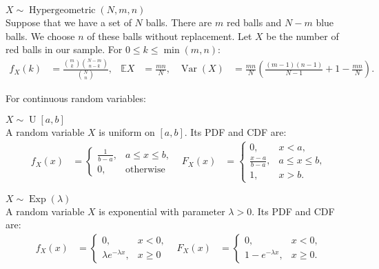 \documentclass{huhtakm-template-book-v2}
\newcommand{\expect}{\mathbb{E}}
\DeclareMathOperator{\Hypergeometric}{Hypergeometric}
\DeclareMathOperator{\U}{U}
\DeclareMathOperator{\Exp}{Exp}
\DeclareMathOperator{\Var}{Var}
\begin{document}
    \begin{seg} $X \sim \Hypergeometric(N,m,n)$\\
        Suppose that we have a set of $N$ balls. There are $m$ red balls and $N-m$ blue balls. We choose $n$ of these balls without replacement. Let $X$ be the number of red balls in our sample. For $0 \leq k \leq \min(m,n)$:
        \begin{align*}
            f_{X}(k) &= \frac{\binom{m}{k}\binom{N-m}{n-k}}{\binom{N}{n}}, & \expect{X} &= \frac{mn}{N}, & \Var(X) &= \frac{mn}{N}\left(\frac{(m-1)(n-1)}{N-1}+1-\frac{mn}{N}\right).
        \end{align*}
    \end{seg}
    For continuous random variables:
    \begin{seg} $X \sim \U[a, b]$\\
        A random variable $X$ is uniform on $[a, b]$. Its PDF and CDF are:
        \begin{align*}
            f_{X}(x) &= \begin{cases}
                \frac{1}{b-a}, &a \leq x \leq b,\\
                0, &\text{otherwise}
            \end{cases} & F_{X}(x) &= \begin{cases}
                0, &x < a,\\
                \frac{x-a}{b-a}, &a \leq x \leq b,\\
                1, &x > b.
            \end{cases}
        \end{align*}    
    \end{seg}
    \begin{seg} $X \sim \Exp(\lambda)$\\
        A random variable $X$ is exponential with parameter $\lambda > 0$. Its PDF and CDF are:
        \begin{align*}
            f_{X}(x) &= \begin{cases}
                0, &x < 0,\\
                \lambda e^{-\lambda x}, &x \geq 0
            \end{cases} & F_{X}(x) &= \begin{cases}
                0, &x < 0,\\
                1-e^{-\lambda x}, &x \geq 0.
            \end{cases}
        \end{align*}
    \end{seg}
\end{document}

